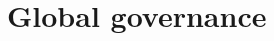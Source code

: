 \documentclass[../summary.tex]{subfiles}
\begin{document}
	
	\section{Global governance}
	
\end{document}
